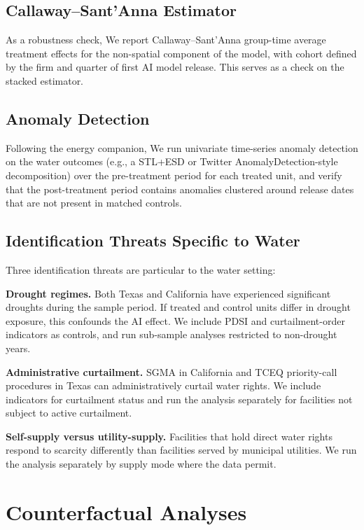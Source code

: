 \documentclass[11pt, letterpaper]{article}
\begin{document}
\subsection{Callaway--Sant'Anna Estimator}
\label{sec:cs}

As a robustness check, We report Callaway--Sant'Anna group-time average treatment effects \citep{callaway2021difference} for the non-spatial component of the model, with cohort defined by the firm and quarter of first AI model release. This serves as a check on the stacked estimator.

\subsection{Anomaly Detection}
\label{sec:anomaly}

Following the energy companion, We run univariate time-series anomaly detection on the water outcomes (e.g., a STL+ESD or Twitter AnomalyDetection-style decomposition) over the pre-treatment period for each treated unit, and verify that the post-treatment period contains anomalies clustered around release dates that are not present in matched controls.

\subsection{Identification Threats Specific to Water}
\label{sec:waterthreats}

Three identification threats are particular to the water setting:

\textbf{Drought regimes.} Both Texas and California have experienced significant droughts during the sample period. If treated and control units differ in drought exposure, this confounds the AI effect. We include PDSI and curtailment-order indicators as controls, and run sub-sample analyses restricted to non-drought years.

\textbf{Administrative curtailment.} SGMA in California and TCEQ priority-call procedures in Texas can administratively curtail water rights. We include indicators for curtailment status and run the analysis separately for facilities not subject to active curtailment.

\textbf{Self-supply versus utility-supply.} Facilities that hold direct water rights respond to scarcity differently than facilities served by municipal utilities. We run the analysis separately by supply mode where the data permit.


\section{Counterfactual Analyses}
\label{sec:counterfactuals}
\end{document}
